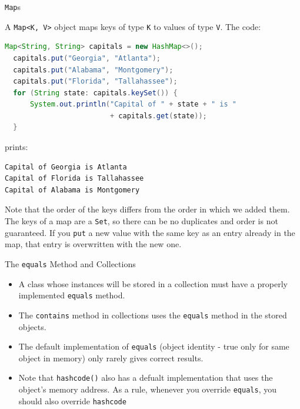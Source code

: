 \documentclass{beamer}
\begin{document}
\begin{frame}[fragile]{{\tt Map}s}

\vspace{-.05in}
A {\tt Map<K, V>} object maps keys of type {\tt K} to values of type {\tt V}.  The code:
\vspace{-.05in}
\begin{lstlisting}[language=Java]
  Map<String, String> capitals = new HashMap<>();
  capitals.put("Georgia", "Atlanta");
  capitals.put("Alabama", "Montgomery");
  capitals.put("Florida", "Tallahassee");
  for (String state: capitals.keySet()) {
      System.out.println("Capital of " + state + " is "
                         + capitals.get(state));
  }
\end{lstlisting}
\vspace{-.05in}
prints:
\vspace{-.05in}
\begin{lstlisting}[language=Java]
Capital of Georgia is Atlanta
Capital of Florida is Tallahassee
Capital of Alabama is Montgomery
\end{lstlisting}
\vspace{-.05in}
Note that the order of the keys differs from the order in which we added them.  The keys of a map are a {\tt Set}, so there can be no duplicates and order is not guaranteed.  If you {\tt put} a new value with the same key as an entry already in the map, that entry is overwritten with the new one.

\end{frame}

\begin{frame}[fragile]{The {\tt equals} Method and Collections}



\begin{itemize}
\item A class whose instances will be stored in a collection must have a properly implemented {\tt equals} method.
\item The {\tt contains} method in collections uses the {\tt equals} method in the stored objects.
\item The default implementation of {\tt equals} (object identity - true only for same object in memory) only rarely gives correct results.
\item Note that {\tt hashcode()} also has a defualt implementation that uses the object's memory address.  As a rule, whenever you override {\tt equals}, you should also override {\tt hashcode}
\end{itemize}


\end{frame}
\end{document}

